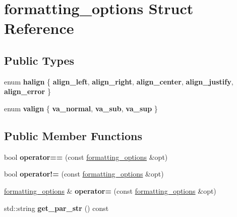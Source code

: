 \hypertarget{structformatting__options}{}\section{formatting\+\_\+options Struct Reference}
\label{structformatting__options}
\subsection*{Public Types}
\begin{DoxyCompactItemize}
\item 
\mbox{\label{structformatting__options_a0c837c02b88724413da9d7295cac2975}} 
enum {\bfseries halign} \{ \newline
{\bfseries align\+\_\+left}, 
{\bfseries align\+\_\+right}, 
{\bfseries align\+\_\+center}, 
{\bfseries align\+\_\+justify}, 
\newline
{\bfseries align\+\_\+error}
 \}
\item 
\mbox{\label{structformatting__options_a429ef2f5d2c2e0787ca9a45915ed2a03}} 
enum {\bfseries valign} \{ {\bfseries va\+\_\+normal}, 
{\bfseries va\+\_\+sub}, 
{\bfseries va\+\_\+sup}
 \}
\end{DoxyCompactItemize}
\subsection*{Public Member Functions}
\begin{DoxyCompactItemize}
\item 
\mbox{\label{structformatting__options_ab731167cca2f6b7bc6367ae7c8352f92}} 
bool {\bfseries operator==} (const \hyperlink{structformatting__options}{formatting\+\_\+options} \&opt)
\item 
\mbox{\label{structformatting__options_af3c7740a12e87400e28320d4c17afa82}} 
bool {\bfseries operator!=} (const \hyperlink{structformatting__options}{formatting\+\_\+options} \&opt)
\item 
\mbox{\label{structformatting__options_a6d2484f23e12fcbb35032982e7035ebe}} 
\hyperlink{structformatting__options}{formatting\+\_\+options} \& {\bfseries operator=} (const \hyperlink{structformatting__options}{formatting\+\_\+options} \&opt)
\item 
\mbox{\label{structformatting__options_a0e4b11798f496175daa7461f05ed1614}} 
std\+::string {\bfseries get\+\_\+par\+\_\+str} () const
\end{DoxyCompactItemize}
